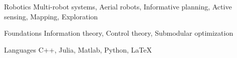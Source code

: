 
\begin{cvskills}
  \cvskill
  {Robotics}
  {Multi-robot systems, Aerial robots, Informative planning, Active sensing,
  Mapping, Exploration}

  \cvskill
  {Foundations}
  {Information theory, Control theory, Submodular optimization}

  \cvskill
  {Languages}
  {C++, Julia, Matlab, Python, LaTeX}

\end{cvskills}
